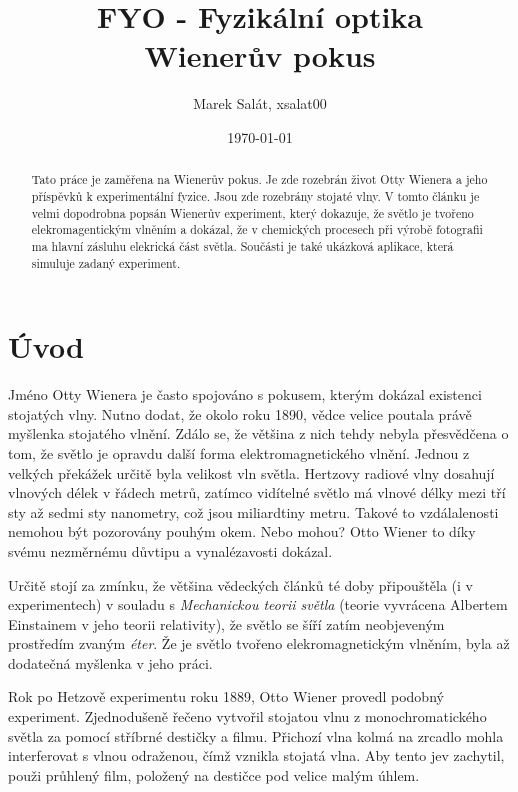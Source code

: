 \documentclass[12pt,a4paper,titlepage,final]{report}
\title{FYO - Fyzikální optika\\Wienerův pokus}
\author{Marek Salát, xsalat00}
\date{\today}
\begin{document}
\lstset{language=Matlab}

\maketitle

\pagestyle{plain}
\setcounter{page}{1}
\tableofcontents

\newpage
\begin{abstract}
Tato práce je zaměřena na Wienerův pokus. Je zde rozebrán život Otty Wienera a jeho příspěvků k experimentální fyzice.
Jsou zde rozebrány stojaté vlny. V tomto článku je velmi dopodrobna popsán Wienerův experiment, který dokazuje, že světlo je
tvořeno elekromagentickým vlněním a dokázal, že v chemických procesech při výrobě fotografii ma hlavní zásluhu
elekrická část světla. Součásti je také ukázková aplikace, která simuluje zadaný experiment.

\end{abstract}

\newpage
\pagestyle{plain}
\setcounter{page}{1}

\section{Úvod}
Jméno Otty Wienera je často spojováno s pokusem, kterým dokázal existenci stojatých vlny. Nutno dodat, že okolo roku 1890, vědce velice poutala právě myšlenka stojatého vlnění. Zdálo se, že většina z nich tehdy nebyla přesvědčena o tom, že světlo je opravdu další 
forma elektromagnetického vlnění. Jednou z velkých překážek určitě byla velikost vln světla. Hertzovy radiové vlny dosahují vlnových délek v řádech metrů, zatímco vidítelné světlo má vlnové délky mezi tří sty až sedmi sty nanometry, což jsou miliardtiny metru. Takové to vzdálalenosti nemohou být pozorovány pouhým okem. Nebo mohou? Otto Wiener to díky svému nezměrnému důvtipu a vynalézavosti dokázal.

Určitě stojí za zmínku, že většina vědeckých článků té doby připouštěla (i v experimentech) v souladu s \emph{Mechanickou teorii světla} (teorie vyvrácena Albertem Einstainem v jeho teorii relativity), že světlo se šíří zatím neobjeveným prostředím zvaným \emph{éter}. Že je světlo
tvořeno elekromagnetickým vlněním, byla až dodatečná myšlenka v jeho práci.
 
Rok po Hetzově experimentu roku 1889, Otto Wiener provedl podobný experiment. Zjednodušeně řečeno vytvořil stojatou vlnu z monochromatického světla za pomocí stříbrné destičky a filmu. Přichozí vlna kolmá na zrcadlo mohla interferovat s vlnou odraženou, čímž vznikla stojatá vlna.
Aby tento jev zachytil, použi průhlený film, položený na destičce pod velice malým úhlem.
\end{document}
